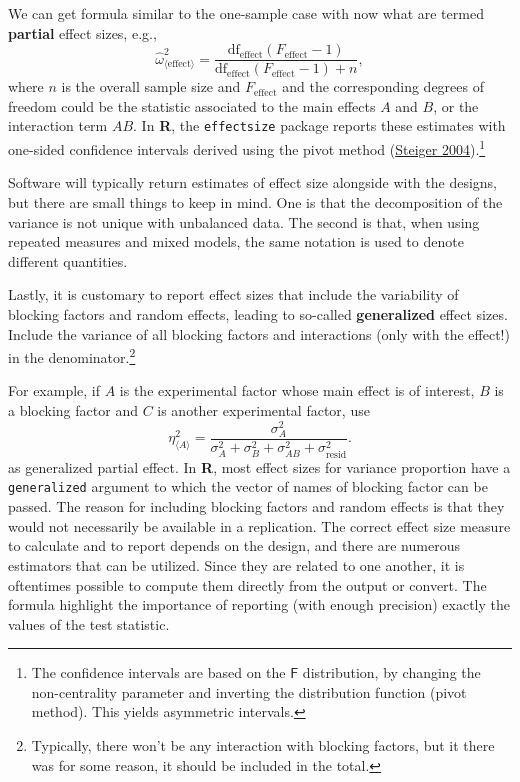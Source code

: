 \documentclass[
  11pt,
  letterpaper,
]{scrbook}
\theoremstyle{definition}
\theoremstyle{remark}
\begin{document}
We can get formula similar to the one-sample case with now what are
termed \textbf{partial} effect sizes, e.g.,
\[\widehat{\omega}^2_{\langle \text{effect} \rangle} = \frac{\text{df}_{\text{effect}}(F_{\text{effect}}-1)}{\text{df}_{\text{effect}}(F_{\text{effect}}-1) + n},\]
where \(n\) is the overall sample size and \(F_\text{effect}\) and the
corresponding degrees of freedom could be the statistic associated to
the main effects \(A\) and \(B\), or the interaction term \(AB\). In
\textbf{R}, the \texttt{effectsize} package reports these estimates with
one-sided confidence intervals derived using the pivot method
(\protect\hyperlink{ref-Steiger:2004}{Steiger 2004}).\footnote{The
  confidence intervals are based on the \(\mathsf{F}\) distribution, by
  changing the non-centrality parameter and inverting the distribution
  function (pivot method). This yields asymmetric intervals.}

Software will typically return estimates of effect size alongside with
the designs, but there are small things to keep in mind. One is that the
decomposition of the variance is not unique with unbalanced data. The
second is that, when using repeated measures and mixed models, the same
notation is used to denote different quantities.

Lastly, it is customary to report effect sizes that include the
variability of blocking factors and random effects, leading to so-called
\textbf{generalized} effect sizes. Include the variance of all blocking
factors and interactions (only with the effect!) in the
denominator.\footnote{Typically, there won't be any interaction with
  blocking factors, but it there was for some reason, it should be
  included in the total.}

For example, if \(A\) is the experimental factor whose main effect is of
interest, \(B\) is a blocking factor and \(C\) is another experimental
factor, use
\[\eta_{\langle A \rangle}^2 = \frac{\sigma^2_A}{\sigma^2_A + \sigma^2_B + \sigma^2_{AB} + \sigma^2_{\text{resid}}}.\]
as generalized partial effect. In \textbf{R}, most effect sizes for
variance proportion have a \texttt{generalized} argument to which the
vector of names of blocking factor can be passed. The reason for
including blocking factors and random effects is that they would not
necessarily be available in a replication. The correct effect size
measure to calculate and to report depends on the design, and there are
numerous estimators that can be utilized. Since they are related to one
another, it is oftentimes possible to compute them directly from the
output or convert. The formula highlight the importance of reporting
(with enough precision) exactly the values of the test statistic.
\end{document}
